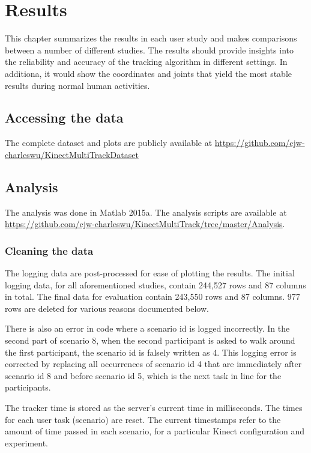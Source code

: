 


\chapter{Results}
\label{chapter:results}

This chapter summarizes the results in each user study and makes comparisons between a number of different studies. The results should provide insights into the reliability and accuracy of the tracking algorithm in different settings. In additiona, it would show the coordinates and joints that yield the most stable results during normal human activities.

\section{Accessing the data}
\label{sec:results_access_data}

The complete dataset and plots are publicly available at \url{https://github.com/cjw-charleswu/KinectMultiTrackDataset}

\section{Analysis}
\label{sec:results_analysis}

The analysis was done in Matlab 2015a. The analysis scripts are available at \url{https://github.com/cjw-charleswu/KinectMultiTrack/tree/master/Analysis}.

\subsection{Cleaning the data}
The logging data are post-processed for ease of plotting the results. The initial logging data, for all aforementioned studies, contain 244,527 rows and 87 columns in total. The final data for evaluation contain 243,550 rows and 87 columns. 977 rows are deleted for various reasons documented below.

There is also an error in code where a scenario id is logged incorrectly. In the second part of scenario 8, when the second participant is asked to walk around the first participant, the scenario id is falsely written as 4. This logging error is corrected by replacing all occurrences of scenario id 4 that are immediately after scenario id 8 and before scenario id 5, which is the next task in line for the participants.

The tracker time is stored as the server's current time in milliseconds. The times for each user task (scenario) are reset. The current timestamps refer to the amount of time passed in each scenario, for a particular Kinect configuration and experiment.

